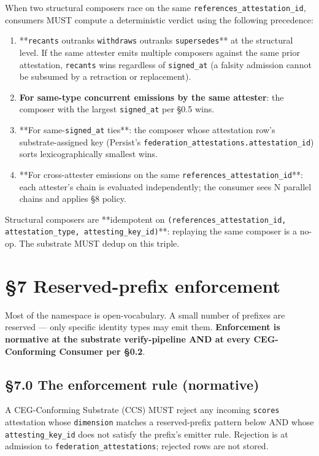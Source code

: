 \documentclass[10pt]{article}
\begin{document}
When two structural composers race on the same \texttt{references\_attestation\_id}, consumers MUST compute a deterministic verdict using the following precedence:


\begin{enumerate}\setlength\itemsep{0pt}
\item **\texttt{recants} outranks \texttt{withdraws} outranks \texttt{supersedes}** at the structural level. If the same attester emits multiple composers against the same prior attestation, \texttt{recants} wins regardless of \texttt{signed\_at} (a falsity admission cannot be subsumed by a retraction or replacement).
\item \textbf{For same-type concurrent emissions by the same attester}: the composer with the largest \texttt{signed\_at} per §0.5 wins.
\item **For same-\texttt{signed\_at} ties**: the composer whose attestation row's substrate-assigned key (Persist's \texttt{federation\_attestations.attestation\_id}) sorts lexicographically smallest wins.
\item **For cross-attester emissions on the same \texttt{references\_attestation\_id}**: each attester's chain is evaluated independently; the consumer sees N parallel chains and applies §8 policy.
\end{enumerate}


Structural composers are **idempotent on \texttt{(references\_attestation\_id, attestation\_type, attesting\_key\_id)}**: replaying the same composer is a no-op. The substrate MUST dedup on this triple.




\clearpage


\section*{§7 Reserved-prefix enforcement}


Most of the namespace is open-vocabulary. A small number of prefixes are reserved — only specific identity types may emit them. \textbf{Enforcement is normative at the substrate verify-pipeline AND at every CEG-Conforming Consumer per §0.2}.


\subsection*{§7.0 The enforcement rule (normative)}


A CEG-Conforming Substrate (CCS) MUST reject any incoming \texttt{scores} attestation whose \texttt{dimension} matches a reserved-prefix pattern below AND whose \texttt{attesting\_key\_id} does not satisfy the prefix's emitter rule. Rejection is at admission to \texttt{federation\_attestations}; rejected rows are not stored.
\end{document}
